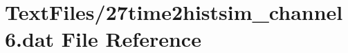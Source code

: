 \hypertarget{27time2histsim__channel6_8dat}{}\section{Text\+Files/27time2histsim\+\_\+channel6.dat File Reference}
\label{27time2histsim__channel6_8dat}

